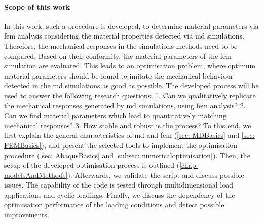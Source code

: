 \paragraph{Scope of this work}
In this work, such a procedure is developed, to determine material parameters via \acrshort{fem} analysis considering the material properties detected via \acrshort{md} simulations. Therefore, the mechanical responses in the simulations methods need to be compared. Based on their conformity, the material parameters of the \acrshort{fem} simulation are evaluated. This leads to an optimisation problem, where optimum material parameters should be found to imitate the mechanical behaviour detected in the \acrshort{md} simulations as good as possible. The developed process will be used to answer the following research questions: 1. Can we qualitatively replicate the mechanical responses generated by \acrshort{md} simulations, using \acrshort{fem} analysis? 2. Can we find material parameters which lead to quantitatively matching mechanical responses? 3. How stable and robust is the process? To this end, we first explain the general characteristics of \acrshort{md} and \acrshort{fem} (\autoref{sec: MDBasics} and \autoref{sec: FEMBasics}), and present the selected tools to implement the optimisation procedure (\autoref{sec: AbaqusBasics} and \autoref{subsec: numericaloptimisation}). Then, the setup of the developed optimisation process is outlined (\autoref{chap: modelsAndMethods}). Afterwards, we validate the script and discuss possible issues. The capability of the code is tested through multidimensional load applications and cyclic loadings. Finally, we discuss the dependency of the optimisation performance of the loading conditions and detect possible improvements.







